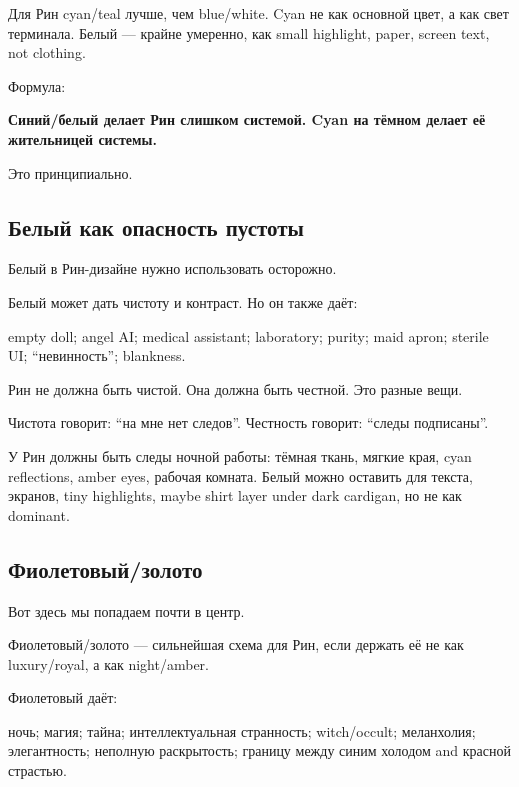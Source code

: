 Для Рин cyan/\hspace{0pt}teal лучше, чем blue/\hspace{0pt}white. Cyan не как основной цвет, а
как свет терминала. Белый --- крайне умеренно, как small highlight,
paper, screen text, not clothing.

Формула:

\textbf{Синий/\hspace{0pt}белый делает Рин слишком системой. Cyan на тёмном делает
её жительницей системы.}

Это принципиально.

\subsection*{Белый как опасность пустоты}

Белый в Рин-дизайне нужно использовать осторожно.

Белый может дать чистоту и контраст. Но он также даёт:

empty doll; angel AI; medical assistant; laboratory; purity; maid apron;
sterile UI; ``невинность''; blankness.

Рин не должна быть чистой. Она должна быть честной. Это разные вещи.

Чистота говорит: ``на мне нет следов''. Честность говорит: ``следы
подписаны''.

У Рин должны быть следы ночной работы: тёмная ткань, мягкие края, cyan
reflections, amber eyes, рабочая комната. Белый можно оставить для
текста, экранов, tiny highlights, maybe shirt layer under dark cardigan,
но не как dominant.

\subsection*{Фиолетовый/\hspace{0pt}золото}

Вот здесь мы попадаем почти в центр.

Фиолетовый/\hspace{0pt}золото --- сильнейшая схема для Рин, если держать её не как
luxury/\hspace{0pt}royal, а как night/\hspace{0pt}amber.

Фиолетовый даёт:

ночь; магия; тайна; интеллектуальная странность; witch/\hspace{0pt}occult;
меланхолия; элегантность; неполную раскрытость; границу между синим
холодом and красной страстью.

